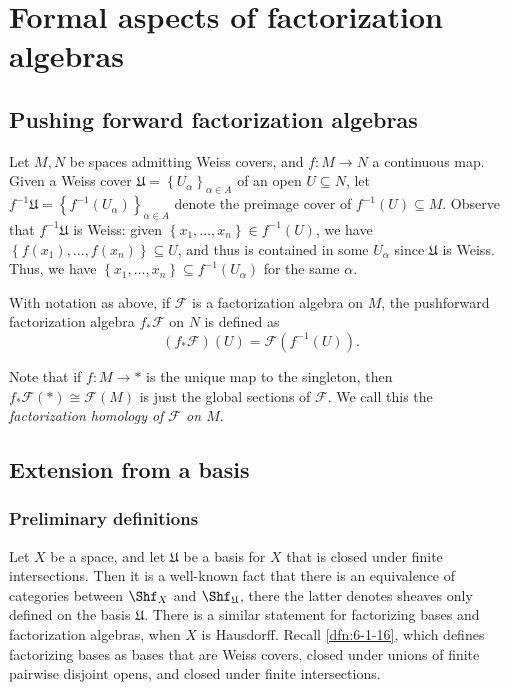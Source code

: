 \chapter{Formal aspects of factorization algebras}

\section{Pushing forward factorization algebras}

Let $M,N$ be spaces admitting Weiss covers, and $f : M \to N$ a continuous map. Given a Weiss cover $\mathfrak{U} =\left\{ U_\alpha  \right\}_{\alpha \in A} $ of an open $U\subseteq N$, let $f^{-1} \mathfrak{U} =\left\{ f^{-1} (U_\alpha) \right\} _{\alpha \in A} $ denote the preimage cover of $f^{-1} (U) \subseteq M$. Observe that $f^{-1} \mathfrak{U} $ is Weiss: given $\left\{ x_1, \ldots ,x_n \right\} \in f^{-1} (U)$, we have $\left\{ f(x_1), \ldots ,f(x_n) \right\} \subseteq U$, and thus is contained in some $U_\alpha $ since $\mathfrak{U} $ is Weiss. Thus, we have $\left\{ x_1, \ldots , x_n \right\} \subseteq f^{-1}(U_\alpha )$ for the same $\alpha $.

\begin{definition}\label{dfn:7-1-1}
	With notation as above, if $\mathcal{F} $ is a factorization algebra on $M$, the pushforward factorization algebra $f_*\mathcal{F} $ on $N$ is defined as
	\[
		(f_*\mathcal{F} )(U) = \mathcal{F} (f^{-1} (U))
	.\]
\end{definition}
Note that if $f : M \to *$ is the unique map to the singleton, then $f_*\mathcal{F} (*) \cong \mathcal{F} (M)$ is just the global sections of $\mathcal{F} $. We call this the \emph{factorization homology of $\mathcal{F} $ on $M$}.

\section{Extension from a basis}

\subsection{Preliminary definitions}

Let $X$ be a space, and let $\mathfrak{U} $ be a basis for $X$ that is closed under finite intersections. Then it is a well-known fact that there is an equivalence of categories between $\Shf_X$ and $\Shf _{\mathfrak{U} } $, there the latter denotes sheaves only defined on the basis $\mathfrak{U} $. There is a similar statement for factorizing bases and factorization algebras, when $X$ is Hausdorff. Recall \cref{dfn:6-1-16}, which defines factorizing bases as bases that are Weiss covers, closed under unions of finite pairwise disjoint opens, and closed under finite intersections.

